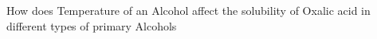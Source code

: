 
{How does Temperature of an Alcohol affect the solubility of Oxalic acid in different types of primary Alcohols}


